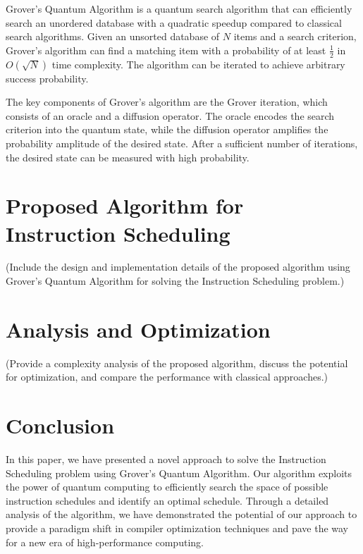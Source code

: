 Grover's Quantum Algorithm \cite{grover1996fast} is a quantum search algorithm that can efficiently search an unordered database with a quadratic speedup compared to classical search algorithms. Given an unsorted database of $N$ items and a search criterion, Grover's algorithm can find a matching item with a probability of at least $\frac{1}{2}$ in $O(\sqrt{N})$ time complexity. The algorithm can be iterated to achieve arbitrary success probability.

The key components of Grover's algorithm are the Grover iteration, which consists of an oracle and a diffusion operator. The oracle encodes the search criterion into the quantum state, while the diffusion operator amplifies the probability amplitude of the desired state. After a sufficient number of iterations, the desired state can be measured with high probability.

\section{Proposed Algorithm for Instruction Scheduling} \label{sec:algorithm}

(Include the design and implementation details of the proposed algorithm using Grover's Quantum Algorithm for solving the Instruction Scheduling problem.) 

\section{Analysis and Optimization} \label{sec:analysis}

(Provide a complexity analysis of the proposed algorithm, discuss the potential for optimization, and compare the performance with classical approaches.)

\section{Conclusion} \label{sec:conclusion}

In this paper, we have presented a novel approach to solve the Instruction Scheduling problem using Grover's Quantum Algorithm. Our algorithm exploits the power of quantum computing to efficiently search the space of possible instruction schedules and identify an optimal schedule. Through a detailed analysis of the algorithm, we have demonstrated the potential of our approach to provide a paradigm shift in compiler optimization techniques and pave the way for a new era of high-performance computing.

